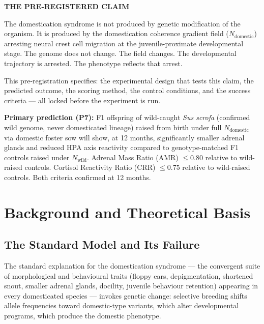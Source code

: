 \documentclass[10pt, a4paper]{article}
\begin{document}
\begin{mdframed}[
  backgroundcolor=claimbox,
  linecolor=claimbox,
  linewidth=0pt,
  innertopmargin=0.7em,
  innerbottommargin=0.7em,
  innerleftmargin=1.0em,
  innerrightmargin=1.0em
]
\color{white}
\textbf{THE PRE-REGISTERED CLAIM}

The domestication syndrome is not produced by
genetic modification of the organism.
It is produced by the domestication coherence
gradient field ($N_{\text{domestic}}$) arresting
neural crest cell migration at the
juvenile-proximate developmental stage.
The genome does not change. The field changes.
The developmental trajectory is arrested.
The phenotype reflects that arrest.

\medskip
This pre-registration specifies: the experimental
design that tests this claim, the predicted
outcome, the scoring method, the control
conditions, and the success criteria ---
all locked before the experiment is run.

\medskip
\textbf{Primary prediction (P7):}
F1 offspring of wild-caught \textit{Sus scrofa}
(confirmed wild genome, never domesticated lineage)
raised from birth under full $N_{\text{domestic}}$
via domestic foster sow will show, at 12 months,
significantly smaller adrenal glands and reduced
HPA axis reactivity compared to genotype-matched
F1 controls raised under $N_{\text{wild}}$.
Adrenal Mass Ratio (AMR) $\leq 0.80$ relative to
wild-raised controls.
Cortisol Reactivity Ratio (CRR) $\leq 0.75$
relative to wild-raised controls.
Both criteria confirmed at 12 months.
\end{mdframed}

\vspace{1em}

\section{Background and Theoretical Basis}

\subsection{The Standard Model and Its Failure}

The standard explanation for the domestication
syndrome --- the convergent suite of morphological
and behavioural traits (floppy ears, depigmentation,
shortened snout, smaller adrenal glands, docility,
juvenile behaviour retention) appearing in every
domesticated species --- invokes genetic change:
selective breeding shifts allele frequencies toward
domestic-type variants, which alter developmental
programs, which produce the domestic phenotype.
\end{document}
